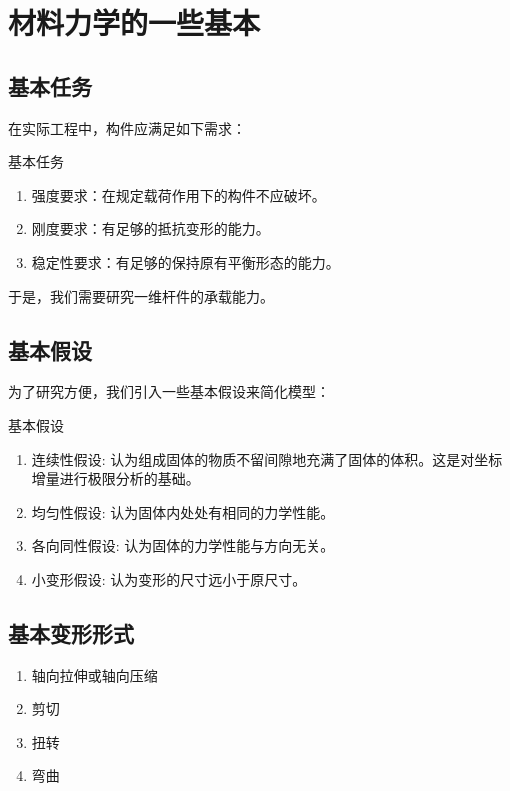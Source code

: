 \chapter{材料力学的一些基本}
\section{基本任务}
在实际工程中，构件应满足如下需求：
\begin{myTheorem}{基本任务}
	\begin{enumerate}
	\item 强度要求：在规定载荷作用下的构件不应破坏。
	\item 刚度要求：有足够的抵抗变形的能力。
	\item 稳定性要求：有足够的保持原有平衡形态的能力。
	\end{enumerate}
\end{myTheorem}

于是，我们需要研究一维杆件的承载能力。

\section{基本假设}
为了研究方便，我们引入一些基本假设来简化模型：
\begin{myhypothesis}{基本假设}
	
\begin{enumerate}
	\item 连续性假设: 认为组成固体的物质不留间隙地充满了固体的体积。这是对坐标增量进行极限分析的基础。\\
	\item 均匀性假设: 认为固体内处处有相同的力学性能。\\
	\item 各向同性假设: 认为固体的力学性能与方向无关。\\
	\item 小变形假设: 认为变形的尺寸远小于原尺寸。
\end{enumerate}
\end{myhypothesis}


\section{基本变形形式}
\begin{enumerate}
	\item 轴向拉伸或轴向压缩
	\item 剪切
	\item 扭转
	\item 弯曲
\end{enumerate}
